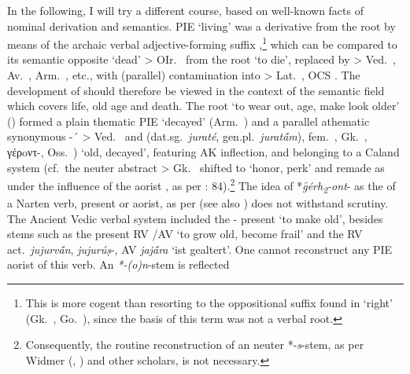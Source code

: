 \documentclass[output=paper,colorlinks,citecolor=brown]{langscibook}
\begin{document}
In the following, I will try a different course, based on well-known facts of nominal derivation and semantics. PIE  ‘living’ was a derivative from the root  by means of the archaic verbal adjective-forming suffix ,\footnote{This is more cogent than resorting to the oppositional suffix found in  ‘right’ (Gk.\  , Go.\ ), since the basis of this term was not a verbal root.} which can be compared to its semantic opposite  ‘dead’ > OIr.\   from the root  ‘to die’, replaced by  > Ved.\  , Av.\  , Arm.\  , etc., with (parallel) contamination into  > Lat.\   , OCS . The development of  should therefore be viewed in the context of the semantic field which covers life, old age and death. The root  ‘to wear out, age, make look older’ () formed a plain thematic  PIE  ‘decayed’ (Arm.\  ) and a parallel athematic synonymous \mbox{-´} > Ved.\   and  (dat.sg.\ \textit{juraté}, gen.pl.\ \textit{juratā́m}), fem.\ , Gk.\  , γέρoντ-, Oss.\ ) ‘old, decayed’, featuring AK  inflection, and belonging to a Caland system  (cf.\  the neuter abstract  > Gk.\   shifted to ‘honor, perk’ and remade as  under the influence of the aorist , as per \citealt{Stueber2002}: 84).\footnote{Consequently, the routine reconstruction of an  neuter *-\textit{s}-stem, as per Widmer (\citeyear[20]{Widmer1997}, \citeyear[50]{Widmer2004}) and other scholars, is not necessary.}  The idea of *\textit{g̑érh\textsubscript{2}-ont}- as the  of a Narten verb, present or aorist, as per \citealt[21]{Widmer1997} (see also ) does not withstand scrutiny. The Ancient Vedic verbal system included the - present  ‘to make old’, besides  stems such as the present RV /AV  ‘to grow old, become frail’ and the   RV  act.\ \textit{jujurvā́n}, \textit{jujurúṣ}-, AV \textit{jajā́ra} ‘ist gealtert’. One cannot reconstruct any PIE aorist of this verb. An \textit{*-(o)n}-stem is reflected 
\end{document}
